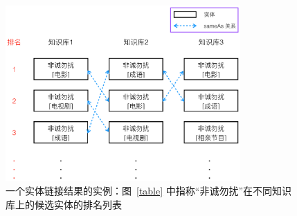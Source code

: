 \begin{figure}[htbp]
\centering
\includegraphics[width=0.8\textwidth]{img/sameas}
\caption{一个实体链接结果的实例：图~\ref{table} 中指称``非诚勿扰''在不同知识库上的候选实体的排名列表}
\label{sameas}
\end{figure}

